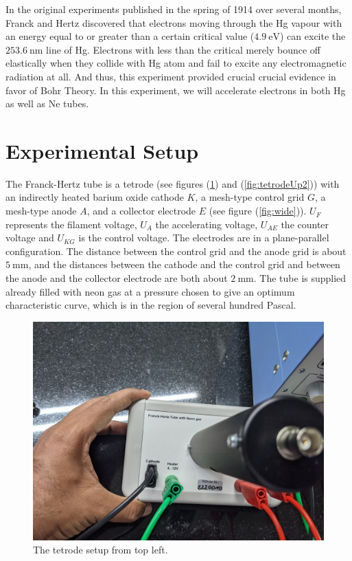 \documentclass[%
 reprint,
 amsmath,amssymb,
 aps,
]{revtex4-2}
\begin{document}
    In the original experiments published in the spring of 1914 over several months, Franck and Hertz discovered that electrons moving through the Hg vapour with an energy equal to or greater than a certain critical value ($\SI{4.9}{\electronvolt}$) can excite the $\SI{253.6}{\nm}$ line of Hg. Electrons with less than the critical merely bounce off elastically when they collide with Hg atom and fail to excite any electromagnetic radiation at all. And thus, this experiment provided crucial crucial evidence in favor of Bohr Theory. In this experiment, we will accelerate electrons in both Hg as well as Ne tubes.
    

\section{Experimental Setup}
    The Franck-Hertz tube is a tetrode (see figures (\ref{fig:tetrodeUp1}) and (\ref{fig:tetrodeUp2})) with an indirectly heated barium oxide cathode $K$, a mesh-type control grid $G$, a mesh-type anode $A$, and a collector electrode $E$ (see figure (\ref{fig:wide})). $U_F$ represents the filament voltage, $U_A$ the accelerating voltage, $U_{AE}$ the counter voltage and $U_{KG}$ is the control voltage. The electrodes are in a plane-parallel configuration. The distance between the control grid and the anode grid is about $\SI{5}{\milli \metre}$, and the distances between the cathode and the control grid and between the anode and the collector electrode are both about $\SI{2}{\milli \metre}$. The tube is supplied already filled with neon gas at a pressure chosen to give an optimum characteristic curve, which is in the region of several hundred Pascal.
    \begin{figure}
        \centering
        \includegraphics[scale = 0.12]{Figures/tetrodeup1.jpg}
        \caption{The tetrode setup from top left.}
        \label{fig:tetrodeUp1}
    \end{figure}
\end{document}
